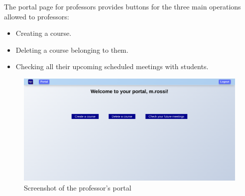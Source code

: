 The portal page for professors provides buttons for the three main operations allowed to professors:
\begin{itemize}
    \item Creating a course.
    \item Deleting a course belonging to them.
    \item Checking all their upcoming scheduled meetings with students.
\end{itemize}

\begin{figure}[H]
    \centering
    \includegraphics[width=\textwidth]{img/user_manual/professor/professor-portal.png}
    \caption{Screenshot of the professor's portal}
\end{figure}
